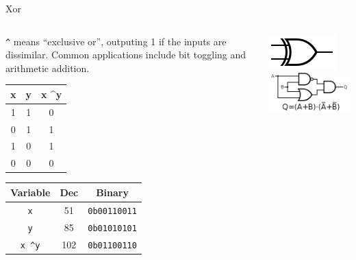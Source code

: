 \documentclass[11pt]{beamer}
\begin{document}
\begin{frame}{Xor}
\begin{columns}
\begin{column}{0.7\textwidth}
\texttt{\textasciicircum} means ``exclusive or'', outputing 1 if the inputs are dissimilar.  Common applications include bit toggling and arithmetic addition.  
\center
\begin{tabular}{| c | c | c |}
\hline
x & y & x \textasciicircum y \\ \hline
1 & 1 & 0 \\ \hline
0 & 1 & 1 \\ \hline
1 & 0 & 1 \\ \hline
0 & 0 & 0 \\ \hline
\end{tabular}

\begin{tabular}{| c | c | c |}
\hline
Variable & Dec & Binary \\ \hline
\texttt{x} & 51 & \texttt{0b00110011} \\ \hline
\texttt{y} & 85 & \texttt{0b01010101} \\ \hline
\texttt{x \textasciicircum y} & 102 & \texttt{0b01100110} \\ \hline
\end{tabular}
\end{column}
\begin{column}{0.3\textwidth}
\center
\includegraphics[scale=0.5]{xorgate.png}
\\
\vspace{2em}
\includegraphics[scale=0.4]{xorInOtherGates.png}
\end{column}
\end{columns}
\end{frame}
\end{document}

